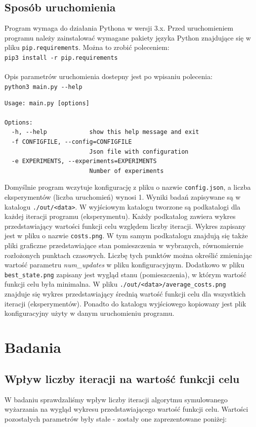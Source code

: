 \documentclass[12pt,a4paper]{article}
\begin{document}
\subsection{Sposób uruchomienia}
Program wymaga do działania Pythona w wersji 3.x.
Przed uruchomieniem programu należy zainstalować wymagane pakiety języka Python
znajdujące się w pliku \texttt{pip.requirements}. Można to zrobić poleceniem:\\
\texttt{pip3 install -r pip.requirements}\\\\
Opis parametrów uruchomienia dostepny jest po wpisaniu polecenia:\\
\texttt{python3 main.py -{}-help}
\begin{verbatim}
Usage: main.py [options]

Options:
  -h, --help            show this help message and exit
  -f CONFIGFILE, --config=CONFIGFILE
                        Json file with configuration
  -e EXPERIMENTS, --experiments=EXPERIMENTS
                        Number of experiments
\end{verbatim}
Domyślnie program wczytuje konfigurację z pliku o nazwie \texttt{config.json},
a liczba eksperymentów (liczba uruchomień) wynosi 1. Wyniki badań zapisywane są w katalogu
\texttt{./out/<data>}. W wyjściowym katalogu tworzone są podkatalogi dla
każdej iteracji programu (eksperymentu). Każdy podkatalog zawiera wykres
przedstawiający wartości funkcji celu względem liczby iteracji. Wykres zapisany
jest w pliku o nazwie \texttt{costs.png}. W tym samym podkatalogu znajdują
się także pliki graficzne przedstawiające stan pomieszczenia w wybranych,
równomiernie rozłożonych punktach czasowych. Liczbę tych punktów można
określić zmieniając wartość parametru \emph{num\_updates} w pliku konfiguracyjnym.
Dodatkowo w pliku \texttt{best\_state.png} zapisany jest wygląd stanu (pomieszczenia),
w którym wartość funkcji celu była minimalna.
W pliku \texttt{./out/<data>/average\_costs.png} znajduje się wykres przedstawiający
średnią wartość funkcji celu dla wszystkich iteracji (eksperymentów).
Ponadto do katalogu wyjściowego kopiowany jest plik konfiguracyjny użyty w danym
uruchomieniu programu.


\section{Badania}
\subsection{Wpływ liczby iteracji na wartość funkcji celu}
W badaniu sprawdzaliśmy wpływ liczby iteracji algorytmu symulowanego wyżarzania
na wygląd wykresu przedstawiającego wartość funkcji celu.
Wartości pozostałych parametrów były stałe - zostały one zaprezentowane poniżej:
\end{document}
